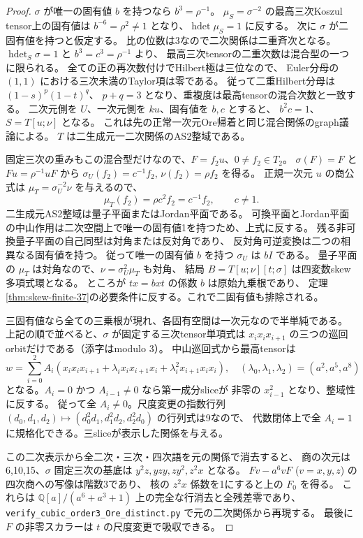 \begin{proof}
$\sigma$ が唯一の固有値 $b$ を持つなら $b^3=\rho^{-1}$。
$\mu_S=\sigma^{-2}$ の最高三次Koszul tensor上の固有値は
$b^{-6}=\rho^2\ne1$ となり、$\operatorname{hdet}\mu_S=1$ に反する。
次に $\sigma$ が二固有値を持つと仮定する。
比の位数は3なので二次関係は二重斉次となる。
$\operatorname{hdet}_S\sigma=1$ と $b^3=c^3=\rho^{-1}$ より、
最高三次tensorの二重次数は混合型の一つに限られる。
全ての正の再次数付けでHilbert極は三位なので、
Euler分母の $(1,1)$ における三次未満のTaylor項は零である。
従って二重Hilbert分母は $(1-s)^p(1-t)^q$、
$p+q=3$ となり、重複度は最高tensorの混合次数と一致する。
二次元側を $U$、一次元側を $ku$、固有値を $b,c$ とすると、
$b^2c=1$、$S=T[u;\nu]$ となる。
これは先の正常一次元Ore帰着と同じ混合関係のgraph議論による。
$T$ は二生成元一二次関係のAS2整域である。

固定三次の重みもこの混合型だけなので、$F=f_2u$、$0\ne f_2\in T_2$。
$\sigma(F)=F$ と $Fu=\rho^{-1}uF$ から
$\sigma_U(f_2)=c^{-1}f_2$, $\nu(f_2)=\rho f_2$ を得る。
正規一次元 $u$ の商公式は
$\mu_T=\sigma_U^{-2}\nu$ を与えるので、
\[
 \mu_T(f_2)=\rho c^2 f_2=c^{-1}f_2,\qquad c\ne1.
\]
二生成元AS2整域は量子平面またはJordan平面である。
可換平面とJordan平面の中山作用は二次空間上で唯一の固有値1を持つため、上式に反する。
残る非可換量子平面の自己同型は対角または反対角であり、
反対角可逆変換は二つの相異なる固有値を持つ。
従って唯一の固有値 $b$ を持つ $\sigma_U$ は $bI$ である。
量子平面の $\mu_T$ は対角なので、$\nu=\sigma_U^2\mu_T$ も対角、
結局 $B=T[u;\nu][t;\sigma]$ は四変数skew多項式環となる。
ところが $tx=bxt$ の係数 $b$ は原始九乗根であり、
定理\ref{thm:skew-finite-37}の必要条件に反する。これで二固有値も排除される。

三固有値なら全ての三乗根が現れ、各固有空間は一次元なので半単純である。
上記の順で並べると、$\sigma$ が固定する三次tensor単項式は
$x_i x_i x_{i+1}$ の三つの巡回orbitだけである（添字はmodulo 3）。
中山巡回式から最高tensorは
\[
 w=\sum_{i=0}^2 A_i
 (x_ix_ix_{i+1}+\lambda_i x_ix_{i+1}x_i
                      +\lambda_i^2x_{i+1}x_ix_i),\quad
 (\lambda_0,\lambda_1,\lambda_2)=(a^2,a^5,a^8)
\]
となる。$A_i=0$ かつ $A_{i-1}\ne0$ なら第一成分sliceが
非零の $x_{i-1}^2$ となり、整域性に反する。
従って全 $A_i\ne0$。尺度変更の指数行列
$(d_0,d_1,d_2)\mapsto(d_0^2d_1,d_1^2d_2,d_2^2d_0)$ の行列式は9なので、
代数閉体上で全 $A_i=1$ に規格化できる。三sliceが表示した関係を与える。

この二次表示から全二次・三次・四次語を元の関係で消去すると、
商の次元は6,10,15、$\sigma$ 固定三次の基底は
$y^2z,yzy,zy^2,z^2x$ となる。
$Fv-a^6vF$ ($v=x,y,z$) の四次商への写像は階数3であり、
核の $z^2x$ 係数を1にすると上の $F_0$ を得る。
これらは $\mathbb Q[a]/(a^6+a^3+1)$ 上の完全な行消去と全残差零であり、
\texttt{verify\_\allowbreak{}cubic\_\allowbreak{}order3\_\allowbreak{}Ore\_\allowbreak{}distinct.py}
で元の二次関係から再現する。
最後に $F$ の非零スカラーは $t$ の尺度変更で吸収できる。
\end{proof}
